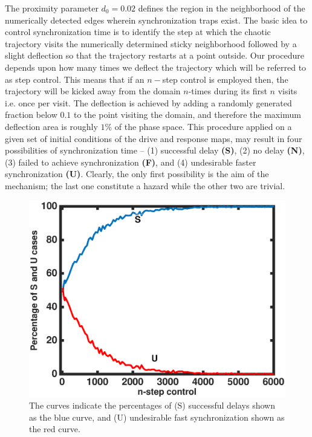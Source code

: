 \documentclass[reprint,superscriptaddress,amsmath,amssymb,aps,pre]{revtex4-1}
\begin{document}
The proximity parameter $d_0 = 0.02$ defines the region in the neighborhood of 
the numerically detected edges wherein synchronization traps exist. The basic 
idea to control synchronization time is to identify the step at which the 
chaotic trajectory visits the numerically determined sticky neighborhood 
followed by a slight deflection so that the trajectory restarts at a point 
outside.  Our procedure depends upon how many times we deflect the trajectory  
which will be referred to as step control. This means that if an $n-$step 
control is  employed then, the trajectory will be kicked away from the domain 
$n$-times during its first $n$ visits i.e. once per visit. The deflection is 
achieved by adding a randomly generated fraction below $0.1$ to the point 
visiting the domain, and therefore the maximum deflection area is roughly 
$1\%$ of the phase space.  This procedure applied on a given set of initial 
conditions of the drive and response maps, may result in four possibilities of 
synchronization time -- (1) successful delay  \textbf{(S)}, (2) no delay 
\textbf{(N)}, (3) failed to achieve synchronization \textbf{(F)}, and (4) 
undesirable faster synchronization \textbf{(U)}. Clearly, the only first 
possibility is the aim of the mechanism; the last one constitute a hazard 
while the other two are trivial. 
\begin{figure}[h]
	\includegraphics[scale=0.45]{S_U_Percent}
	\caption{\label{fig:Control_success}\footnotesize The curves indicate the 
		percentages of (S) successful delays shown as the blue curve, and (U) 
		undesirable fast synchronization shown as the red curve. }
\end{figure}
\end{document}
